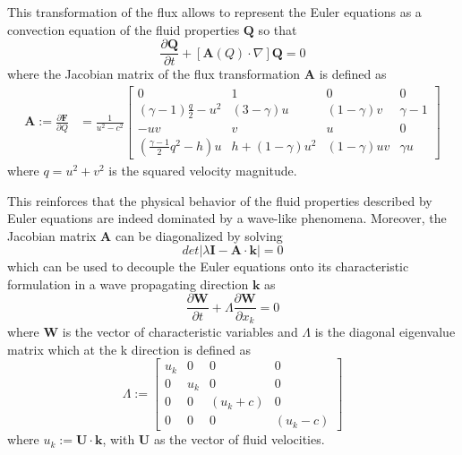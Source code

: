 This transformation of the flux allows to represent the Euler equations as a convection equation of the fluid properties $\textbf{Q}$ so that
%
\begin{equation} \label{eq:eq_euler_transf}
    \frac{\partial \textbf{Q}}{\partial t} + \left[ \textbf{A}(Q) \cdot \nabla \right] \textbf{Q} = 0
\end{equation}
% 
where the Jacobian matrix of the flux transformation $\textbf{A}$ is defined as
%
\begin{align} \label{eq:eq_jac_transf}
    \textbf{A} := \frac{\partial \textbf{F}}{\partial Q} &= \frac{1}{u^2 - c^2} 
\begin{bmatrix}
    0 & 1 & 0 & 0\\
	(\gamma - 1)\frac{q}{2} - u^2 & (3-\gamma)u & (1-\gamma)v & \gamma-1\\
	-uv & v & u & 0\\
	\left ( \frac{\gamma-1}{2}q^2 - h \right ) u & h + (1-\gamma)u^2 & (1-\gamma)uv & \gamma u     
\end{bmatrix}     
\end{align}
%
where $q = u^2 + v^2$ is the squared velocity magnitude.

This reinforces that the physical behavior of the fluid properties described by Euler equations are indeed dominated by a wave-like phenomena. Moreover, the Jacobian matrix $\textbf{A}$ can be diagonalized by solving
%
\begin{equation} \label{eq:eq_eigen}
    	det | \lambda \textbf{I} - \textbf{A} \cdot \textbf{\^{k}}| = 0
\end{equation}
%
which can be used to decouple the Euler equations onto its characteristic formulation in a wave propagating direction $\textbf{\^{k}}$ as
%
\begin{equation} \label{eq:eq_euler_char}
    	\frac{\partial \textbf{W}}{\partial t} + \Lambda \frac{\partial \textbf{W}}{\partial x_{k}} = 0
\end{equation}
%
where $\textbf{W}$ is the vector of characteristic variables and $\Lambda$ is the diagonal eigenvalue matrix which at the k direction is defined as
%
\begin{equation} \label{eq:eq_char_vec}
    	 \Lambda := \begin{bmatrix}
		    u_k      &     0        &      0         &      0         \\
  	           0      &  u_k        &      0         &      0         \\
			   0      &     0        &  (u_k + c)  &      0         \\
			   0      &     0        &      0         &  (u_k - c)    	 
    	 \end{bmatrix}
\end{equation}
%
where $u_k := \textbf{U} \cdot \textbf{\^{k}}$, with $\textbf{U}$ as the vector of fluid velocities.

